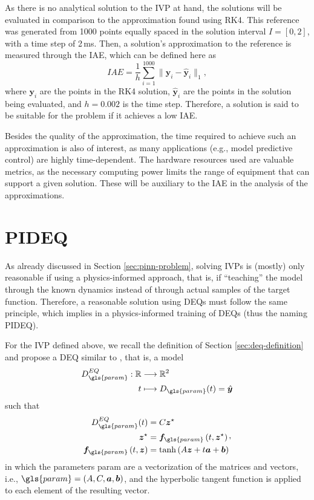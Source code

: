 As there is no analytical solution to the \gls{IVP} at hand, the solutions will be evaluated in comparison to the approximation found using \gls{RK4}.
This reference was generated from 1000 points equally spaced in the solution interval $I=[0,2]$, with a time step of 2\,ms\footnotemark.
Then, a solution's approximation to the reference is measured through the \gls{IAE}, which can be defined here as \[
    IAE = \frac{1}{h}\sum_{i=1}^{1000} \|\bm{y}_i - \hat{\bm{y}}_i\|_1
,\] where $\bm{y}_i$ are the points in the \gls{RK4} solution,  $\hat{\bm{y}}_i$ are the points in the solution being evaluated, and $h=0.002$ is the time step.
Therefore, a solution is said to be suitable for the problem if it achieves a low \gls{IAE}.

Besides the quality of the approximation, the time required to achieve such an approximation is also of interest, as many applications (e.g., model predictive control) are highly time-dependent.
The hardware resources used are valuable metrics, as the necessary computing power limits the range of equipment that can support a given solution.
These will be auxiliary to the \gls{IAE} in the analysis of the approximations.

\section{PIDEQ}\label{sec:pideq}

As already discussed in Section \ref{sec:pinn-problem}, solving \gls{IVP}s is (mostly) only reasonable if using a physics-informed approach, that is, if ``teaching'' the model through the known dynamics instead of through actual samples of the target function.
Therefore, a reasonable solution using \gls{DEQ}s must follow the same principle, which implies in a physics-informed training of \gls{DEQ}s (thus the naming \gls{PIDEQ}).

For the \gls{IVP} defined above, we recall the definition of Section \ref{sec:deq-definition} and propose a \gls{DEQ} similar to \textcite{Ghaoui2019}, that is, a model
\begin{align*}
    D_{\gls{param}}^{EQ}: \R &\longrightarrow \R^2 \\
    t &\longmapsto D_{\gls{param}}(t) = \hat{\bm{y}}
\end{align*}
such that
\begin{equation}
\begin{split}
    D^{EQ}_{\gls{param}}(t) &= C\bm{z}^{\star} \\
    \bm{z}^{\star} &= \bm{f}_{\gls{param}}\left( t,\bm{z}^{\star} \right) \\
    \bm{f}_{\gls{param}}\left( t,\bm{z} \right) &= \tanh \left( A\bm{z} + t\bm{a} + \bm{b} \right)
\end{split}
,\end{equation}
in which the parameters \gls{param} are a vectorization of the matrices and vectors, i.e., $\gls{param} = \left( A,C,\bm{a},\bm{b} \right)$, and the hyperbolic tangent function is applied to each element of the resulting vector.

